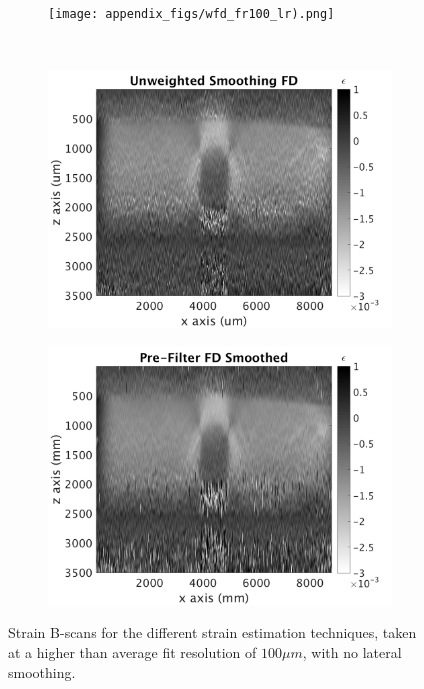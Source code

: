 \begin{figure}[h]
\begin{subfigure}{0.49\textwidth}
    \end{subfigure}
    \begin{subfigure}{0.49\textwidth}
    	\centering
        \texttt{[image: appendix\_figs/wfd\_fr100\_lr).png]}
    \end{subfigure}
    \\
    \begin{subfigure}{0.49\textwidth}
    	\centering
        \includegraphics[width=\textwidth]{appendix_figs/uwfd_fr100_lr0.png}
    \end{subfigure}
    \begin{subfigure}{0.49\textwidth}
    	\centering
        \includegraphics[width=\textwidth]{appendix_figs/fdsm_fr100_lr0.png}
    \end{subfigure}    
    \label{images_high_fitres}
    \caption{Strain B-scans for the different strain estimation techniques, taken at a higher than average fit resolution of $100\mu m$, with no lateral smoothing.}
\end{figure}

